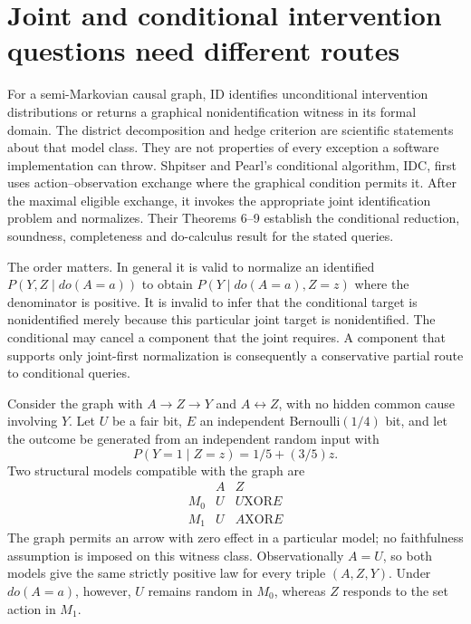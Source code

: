 \section{Joint and conditional intervention questions need different routes}
\label{exec17:s3-idc}

For a semi-Markovian causal graph, ID identifies unconditional
intervention distributions or returns a graphical nonidentification
witness in its formal domain. The district decomposition and hedge
criterion are scientific statements about that model class.
They are not properties of every exception a software implementation
can throw. Shpitser and Pearl's conditional algorithm, IDC, first
uses action--observation exchange where the graphical condition permits
it. After the maximal eligible exchange, it invokes the appropriate
joint identification problem and normalizes. Their Theorems 6--9
establish the conditional reduction, soundness, completeness and
do-calculus result for the stated
queries.\citep{id2006}

The order matters. In general it is valid to normalize an identified
$P(Y,Z\mid do(A=a))$ to obtain $P(Y\mid do(A=a),Z=z)$
where the denominator is positive. It is invalid to infer that
the conditional target is nonidentified merely because this particular
joint target is nonidentified. The conditional may cancel a component
that the joint requires. A component that supports only joint-first
normalization is consequently a conservative partial route to
conditional queries.

Consider the graph with $A\to Z\to Y$ and $A\leftrightarrow Z$,
with no hidden common cause involving $Y$. Let $U$ be a fair bit,
$E$ an independent Bernoulli$(1/4)$ bit, and let the outcome be generated
from an independent random input with
\[
 P(Y=1\mid Z=z)=1/5+(3/5)z.
\]
Two structural models compatible with the graph are
\[
\begin{array}{c|cc}
 & A&Z\\ \hline
 M_0&U&U\mathbin{\mathrm{XOR}}E\\
 M_1&U&A\mathbin{\mathrm{XOR}}E
\end{array}
\]
The graph permits an arrow with zero effect in a particular model;
no faithfulness assumption is imposed on this witness class.
Observationally $A=U$, so both models give the same strictly positive
law for every triple $(A,Z,Y)$. Under $do(A=a)$, however, $U$ remains
random in $M_0$, whereas $Z$ responds to the set action in
$M_1$.\citep{exec17_s3_exact}

